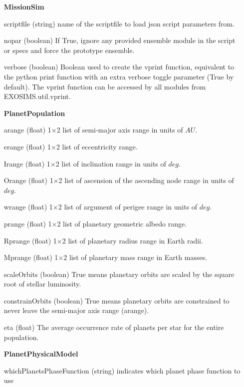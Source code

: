 \documentclass[cleanfoot]{asme2ej}
\begin{document}
\begin{itemize}[leftmargin=1.5in,font={\ttfamily}]

\item[\textbf{MissionSim}]
\item[scriptfile] (string) name of the scriptfile to load json script parameters from.
\item[nopar] (boolean) If True, ignore any provided ensemble module in the script or specs and force the prototype ensemble.
\item[verbose] (boolean) Boolean used to create the vprint function, equivalent to the python print function with an extra verbose toggle parameter (True by default). The vprint function can be accessed by all modules from EXOSIMS.util.vprint.

\item[\textbf{PlanetPopulation}]
\item[arange] (float) 1$\times$2 list of semi-major axis range in units of $ AU $. 
\item[erange] (float) 1$\times$2 list of eccentricity range.
\item[Irange] (float) 1$\times$2 list of inclination range in units of $ deg $.  
\item[Orange] (float) 1$\times$2 list of ascension of the ascending node range in units of $ deg $.  
\item[wrange] (float) 1$\times$2 list of argument of perigee range in units of $ deg $. 
\item[prange] (float) 1$\times$2 list of planetary geometric albedo range.  
\item[Rprange] (float) 1$\times$2 list of planetary radius range in Earth radii.  
\item[Mprange] (float) 1$\times$2 list of planetary mass range in Earth masses.  
\item [scaleOrbits] (boolean) True means planetary orbits are scaled by the square root of stellar luminosity. 
\item[constrainOrbits] (boolean) True means planetary orbits are constrained to never leave the semi-major axis range (arange).
\item[eta] (float) The average occurrence rate of planets per star for the entire population.

\item[\textbf{PlanetPhysicalModel}]
\item[whichPlanetsPhaseFunction] (string) indicates which planet phase function to use


\end{itemize}
\end{document}

